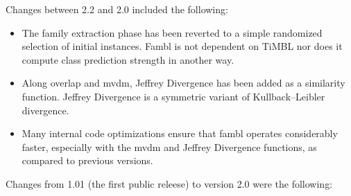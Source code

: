 \documentclass[11pt]{article}
\begin{document}
Changes between 2.2 and 2.0 included the following:

\begin{itemize}
\item
The family extraction phase has been reverted to a simple randomized
selection of initial instances. {\sc Fambl} is not dependent on {\sc TiMBL} nor
does it compute class prediction strength in another way.
\item
Along overlap and {\sc mvdm}, Jeffrey Divergence has been added as a
similarity function. Jeffrey Divergence is a symmetric variant of
Kullback--Leibler divergence.
\item
Many internal code optimizations ensure that {\sc fambl} operates
considerably faster, especially with the {\sc mvdm} and Jeffrey Divergence
functions, as compared to previous versions.
\end{itemize}

Changes from 1.01 (the first public releese) to version 2.0 were the
following:
\end{document}
